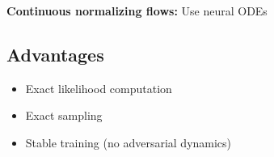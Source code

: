 \textbf{Continuous normalizing flows:} Use neural ODEs

\subsection{Advantages}

\begin{itemize}
    \item Exact likelihood computation
    \item Exact sampling
    \item Stable training (no adversarial dynamics)
\end{itemize}





